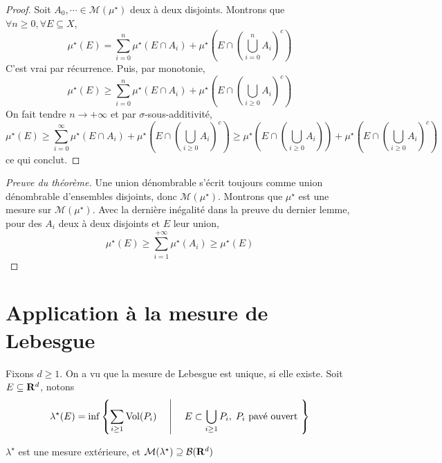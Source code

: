 \begin{proof}
    Soit $A_0, \cdots \in \mathcal M(\mu^\star)$ deux à deux disjoints. Montrons que $ \forall  n\geq 0, \forall  E\subseteq X$, \[
        \mu^\star(E)= \sum_{i=0}^{n} \mu^\star(E\cap A_i)+\mu^\star\left(E\cap\left(\bigcup_{i=0}^nA_i\right)^c\right)
    \] 
    C'est vrai par récurrence. %
    Puis, par monotonie, \[
        \mu^\star(E)\geq \sum_{i=0}^n\mu^\star(E\cap A_i)+\mu^\star\left(E\cap \left(\bigcup_{i\geq 0}A_i\right)^c\right)
    \]
    On fait tendre $n\to +\infty$ et par $\sigma$-sous-additivité,  \[
        \mu^\star(E)\geq \sum_{i=0}^{\infty}\mu^\star(E\cap A_i)+\mu^\star\left(E\cap \left(\bigcup_{i\geq 0}A_i\right)^c\right)\geq  \mu^\star\left(E\cap \left(\bigcup_{i\geq 0}A_i\right)\right) + \mu^\star\left(E\cap \left(\bigcup_{i\geq 0}A_i\right)^c\right)
    \] 
    ce qui conclut.
\end{proof}

\begin{proof}[Preuve du théorème]
    Une union dénombrable s'écrit toujours comme union dénombrable d'ensembles disjoints, donc $\mathcal  M(\mu^\star)$. Montrons que $\mu^\star$ est une mesure sur  $\mathcal  M(\mu^\star)$. Avec la dernière inégalité dans la preuve du dernier lemme, pour  des $A_i$ deux à deux disjoints et  $E$ leur union,  \[
        \mu^\star(E)\geq \sum_{i=1}^{+\infty}\mu^\star(A_i)\geq \mu^\star(E)
    \]
\end{proof}

\section{Application à la mesure de Lebesgue}

Fixons $d\geq 1$. On a vu que la mesure de Lebesgue est unique, si elle existe. Soit $E\subseteq \mathbf R^d$, notons \[
    \lambda^\star(E)=\inf \left\{ \sum_{i\geq 1}\mathrm{Vol}(P_i) \quad  \suchthat \quad  E\subset \bigcup_{i\geq 1}P_i, \; P_i\text{ pavé ouvert } \right\} 
\] 

\begin{thm}
    $\lambda^\star$ est une mesure extérieure, et  $\mathcal  M(\lambda^\star)\supseteq \mathcal  B(\mathbf R^d)$
\end{thm}

